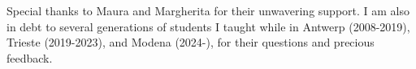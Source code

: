 

Special thanks to Maura and Margherita for their unwavering support. I am also in debt to several generations of students I taught while in Antwerp (2008-2019), Trieste (2019-2023), and Modena (2024-), for their questions and precious feedback.
